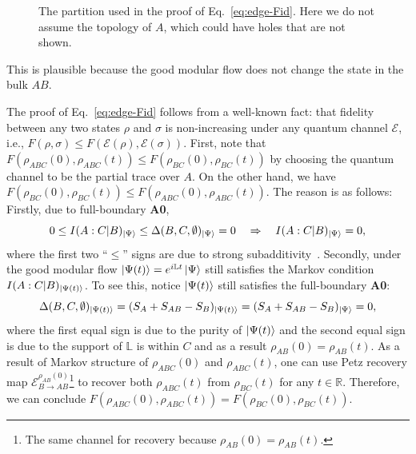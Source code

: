 \documentclass[12pt, nofootinbib]{article}
\theoremstyle{plain}
\theoremstyle{assumption}
\theoremstyle{definition}
\theoremstyle{plain}
\theoremstyle{plain}
\theoremstyle{plain}
\theoremstyle{plain}
\theoremstyle{plain}
\newcommand{\calE}{{\mathcal E}}
\def\Lb{\mathbb{L}}
\begin{document}
\begin{figure}[!h]
    \centering
    \caption{The partition used in the proof of Eq.~\eqref{eq:edge-Fid}. Here we do not assume the topology of $A$, which could have holes that are not shown. }
    \label{fig:ABC-for-fid}
\end{figure}

This is plausible because the good modular flow does not change the state in the bulk $AB$. 

The proof of Eq.~\eqref{eq:edge-Fid} follows from a well-known fact: that fidelity between any two states $\rho$ and $\sigma$ is non-increasing under any quantum channel $\calE$, i.e., $F(\rho,\sigma)\leq F(\calE(\rho),\calE(\sigma))$. First, note that $F(\rho_{ABC}(0),\rho_{ABC}(t))\leq F(\rho_{BC}(0),\rho_{BC}(t))$ by choosing the quantum channel to be the partial trace over $A$. On the other hand, we have $ F(\rho_{BC}(0),\rho_{BC}(t))\leq F(\rho_{ABC}(0),\rho_{ABC}(t))$. The reason is as follows: Firstly, due to full-boundary {\bf A0}, 
\begin{equation}
    0\leq I(A:C|B)_{\left|\Psi\right\rangle}\leq \Delta(B,C,\emptyset)_{\left|\Psi\right\rangle}=0 \quad \Rightarrow\quad I(A:C|B)_{\left|\Psi\right\rangle}=0,
\end{equation}
where the first two ``$\leq$'' signs are due to strong subadditivity~\cite{Lieb1973}. Secondly, under the good modular flow $\ket{\Psi(t)} = e^{i\Lb t}\ket{\Psi}$ still satisfies the Markov condition $I(A:C|B)_{\left|\Psi(t)\right\rangle}$. To see this, notice $\left|\Psi(t)\right\rangle$ still satisfies the full-boundary {\bf A0}: 
\begin{equation}
    \Delta(B,C,\emptyset)_{\left|\Psi(t)\right\rangle} = (S_A + S_{AB}-S_{B})_{\left|\Psi(t)\right\rangle} = (S_A + S_{AB}-S_{B})_{\left|\Psi\right\rangle}=0, 
\end{equation}
where the first equal sign is due to the purity of $\left|\Psi(t)\right\rangle$ and the second equal sign is due to the support of $\Lb$ is within $C$ and as a result $\rho_{AB}(0) = \rho_{AB}(t)$. As a result of Markov structure of $\rho_{ABC}(0)$ and $\rho_{ABC}(t)$, one can use Petz recovery map $\calE_{B\to AB}^{\rho_{AB}(0)}$\footnote{The same channel for recovery because $\rho_{AB}(0) = \rho_{AB}(t)$.} \cite{Petz2003} to recover both $\rho_{ABC}(t)$ from $\rho_{BC}(t)$ for any $t \in \mathbb{R}$. Therefore, we can conclude $F(\rho_{ABC}(0),\rho_{ABC}(t))= F(\rho_{BC}(0),\rho_{BC}(t))$. 


 
\end{document}
